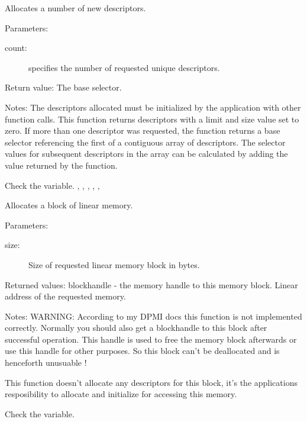{Allocates a number of new descriptors.

Parameters: 
\begin{description}
\item[count:\ ] specifies the number of requested unique descriptors.
\end{description}

Return value: The base selector.

Notes: The descriptors allocated must be initialized by the application with
other function calls. This function returns descriptors with a limit and
size value set to zero. If more than one descriptor was requested, the
function returns a base selector referencing the first of a contiguous array
of descriptors. The selector values for subsequent descriptors in the array
can be calculated by adding the value returned by the
function.
}
{ Check the  variable. }
{
,
,
,
,
,
}

\html{}

{Allocates a block of linear memory.

Parameters: 
\begin{description}
\item[size:\ ] Size of requested linear memory block in bytes.
\end{description}

Returned values: blockhandle - the memory handle to this memory block. Linear
address of the requested memory.

Notes: WARNING: According to my DPMI docs this function is not implemented
correctly. Normally you should also get a blockhandle to this block after
successful operation. This handle is used to free the memory block
afterwards or use this handle for other purposes. So this block can't be
deallocated and is henceforth unusuable !

This function doesn't allocate any descriptors for this block, it's the
applications resposibility to allocate and initialize for accessing this
memory.
}{ Check the  variable.}
{  }

